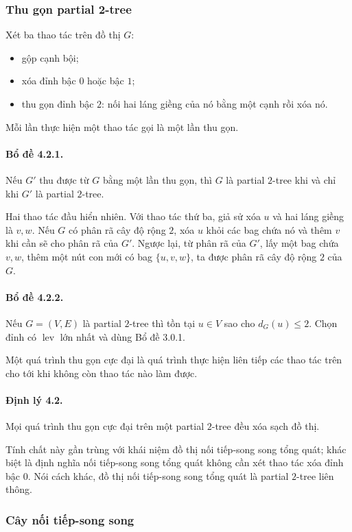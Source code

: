 \documentclass[11pt]{article}
\begin{document}
\subsubsection{Thu gọn partial 2-tree}

Xét ba thao tác trên đồ thị $G$:
\begin{itemize}
  \item gộp cạnh bội;
  \item xóa đỉnh bậc $0$ hoặc bậc $1$;
  \item thu gọn đỉnh bậc $2$: nối hai láng giềng của nó bằng một cạnh rồi xóa
  nó.
\end{itemize}
Mỗi lần thực hiện một thao tác gọi là một lần thu gọn.

\paragraph{Bổ đề 4.2.1.}
Nếu $G'$ thu được từ $G$ bằng một lần thu gọn, thì $G$ là partial $2$-tree khi
và chỉ khi $G'$ là partial $2$-tree.

Hai thao tác đầu hiển nhiên. Với thao tác thứ ba, giả sử xóa $u$ và hai láng
giềng là $v,w$. Nếu $G$ có phân rã cây độ rộng $2$, xóa $u$ khỏi các bag chứa
nó và thêm $v$ khi cần sẽ cho phân rã của $G'$. Ngược lại, từ phân rã của $G'$,
lấy một bag chứa $v,w$, thêm một nút con mới có bag $\{u,v,w\}$, ta được phân
rã cây độ rộng $2$ của $G$.

\paragraph{Bổ đề 4.2.2.}
Nếu $G=(V,E)$ là partial $2$-tree thì tồn tại $u\in V$ sao cho $d_G(u)\le 2$.
Chọn đỉnh có $\operatorname{lev}$ lớn nhất và dùng Bổ đề 3.0.1.

Một quá trình thu gọn cực đại là quá trình thực hiện liên tiếp các thao tác trên
cho tới khi không còn thao tác nào làm được.

\paragraph{Định lý 4.2.}
Mọi quá trình thu gọn cực đại trên một partial $2$-tree đều xóa sạch đồ thị.

Tính chất này gần trùng với khái niệm đồ thị nối tiếp-song song tổng quát; khác
biệt là định nghĩa nối tiếp-song song tổng quát không cần xét thao tác xóa đỉnh
bậc $0$. Nói cách khác, đồ thị nối tiếp-song song tổng quát là partial
$2$-tree liên thông.

\subsubsection{Cây nối tiếp-song song}
\end{document}
